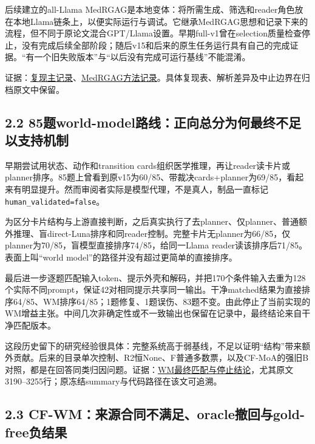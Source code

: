 \documentclass[
  11pt,
  a4paper,
]{article}
\begin{document}
后续建立的all-Llama
MedRGAG是本地变体：将所需生成、筛选和reader角色放在本地Llama链条上，以便实际运行与调试。它继承MedRGAG思想和记录下来的流程，但不同于原论文混合GPT/Llama设置。早期full-v1曾在selection质量检查停止，没有完成后续全部阶段；随后v15和后来的原生任务运行具有自己的完成证据。``有一个旧失败版本''与``以后没有完成可运行基线''不能混淆。

证据：\href{https://github.com/xiotakut/cf_mrg/blob/main/papers/2026-10-02_cf_moa/author_dossier/records/archive/medrgag_reproduction.md\#record-0258}{复现主记录}、\href{https://github.com/xiotakut/cf_mrg/blob/main/papers/2026-10-02_cf_moa/author_dossier/records/baselines/medrgag.md}{MedRGAG方法记录}。具体复现表、解析差异及中止边界在归档原文中保留。

\subsection{2.2
85题world-model路线：正向总分为何最终不足以支持机制}\label{ux9898world-modelux8defux7ebfux6b63ux5411ux603bux5206ux4e3aux4f55ux6700ux7ec8ux4e0dux8db3ux4ee5ux652fux6301ux673aux5236}

早期尝试用状态、动作和transition
cards组织医学推理，再让reader读卡片或planner排序。85题上曾看到原v15为60/85、带裁决cards+planner为69/85，看起来有明显提升。然而审阅者实际是模型代理，不是真人，制品一直标记\texttt{human\_\allowbreak{}validated=false}。

为区分卡片结构与上游直接判断，之后真实执行了去planner、仅planner、普通额外推理、盲direct-Luna排序和同reader控制。完整卡片无planner为66/85，仅planner为70/85，盲模型直接排序74/85，给同一Llama
reader读该排序后71/85。表面上叫``world
model''的路径并没有超过更简单的直接排序。

最后进一步逐题匹配输入token、提示外壳和解码，并把170个条件输入去重为128个实际不同prompt，保证42对相同提示共享同一输出。干净matched结果为直接排序64/85、WM排序64/85；1题修复、1题误伤、83题不变。由此停止了当前实现的WM增益主张。中间几次非确定性或不一致输出也保留在记录中，最终结论来自干净匹配版本。

这段历史留下的研究经验很具体：完整系统高于弱基线，不足以证明``结构''带来额外贡献。后来的目录单次控制、R2恒None、F普通多数票，以及CF-MoA的强旧B对照，都是在回答同类归因问题。证据：\href{https://github.com/xiotakut/cf_mrg/blob/main/papers/2026-10-02_cf_moa/author_dossier/records/archive/wm_medrgag.md}{WM最终匹配与停止结论}，尤其原文3190--3255行；原冻结summary与代码路径在该文可追溯。

\subsection{2.3
CF-WM：来源合同不满足、oracle撤回与gold-free负结果}\label{cf-wmux6765ux6e90ux5408ux540cux4e0dux6ee1ux8db3oracleux64a4ux56deux4e0egold-freeux8d1fux7ed3ux679c}
\end{document}
